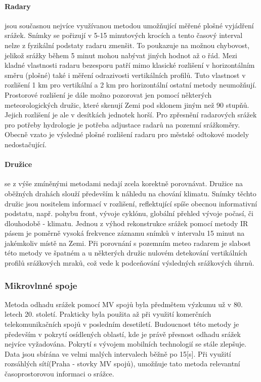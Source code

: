 \documentclass[a4paper,12pt,oneside]{report}
\begin{document}
\paragraph*{Radary}
jsou současnou nejvíce využívanou metodou umožňující měřené plošné vyjádření srážek. Snímky se pořizují v 5-15 minutových krocích a tento časový interval nelze z fyzikální podstaty radaru zmenšit. To poukazuje na možnou chybovost, jelikož srážky během 5 minut mohou nabývat jiných hodnot až o řád. Mezi kladné vlastnosti radaru bezesporu patří mimo klasické rozlišení v horizontálním směru (plošné) také i měření odrazivosti vertikálních profilů. Tuto vlastnost v rozlišení 1 km pro vertikální a 2 km pro horizontální ostatní metody neumožňují. Prostorové rozlišení je dále možno pozorovat jen pomocí některých meteorologických družic, které skenují Zemi pod sklonem jiným než 90 stupňů. Jejich rozlišení je ale v desítkách jednotek horší. Pro zpřesnění radarových srážek pro potřeby hydrologie je potřeba  adjustace radarů na pozemní srážkoměry. Obecně vzato je výsledné plošné rozlišení radaru pro městské odtokové modely nedostačující.   

\paragraph*{Družice} se z výše zmíněnými metodami nedají zcela korektně porovnávat. Družice na oběžných drahách slouží především k náhledu na chování klimatu. Snímky těchto družic jsou nositelem informací v rozlišení, reflektující spíše obecnou informativní podstatu, např. pohybu front, vývoje cyklónu, globální přehled vývoje počasí, či dlouhodobě - klimatu.
Jednou z výhod rekonstrukce srážek pomocí metody \acs{IR} pásem je poměrně vysoká frekvence záznamu snímků v intervalu 15 minut na jakémkoliv místě na Zemi. Při porovnání s pozemním meteo radarem je slabost této metody ve špatném a u některých družic nulovém detekování vertikálních profilů srážkových mraků, což vede k podceňování výsledných srážkových úhrnů.


\subsubsection{Mikrovlnné spoje}
Metoda odhadu srážek pomocí MV spojů byla předmětem výzkumu už v 80. letech 20. století. Prakticky byla použita až při využití komerčních telekomunikačních spojů v posledním desetiletí. Budoucnost této metody je především v pokrytí  osídlených oblastí, kde je právě přesnost odhadu srážek nejvíce vyžadována. Pokrytí s vývojem mobilních technologií se stále zlepšuje. Data jsou sbírána ve velmi malých intervalech běžně po 15[s]. Při využití rozsáhlých sítí(Praha - stovky MV spojů), umožňuje tato metoda relevantní časoprostorovou informaci o srážce.
 
\end{document}
